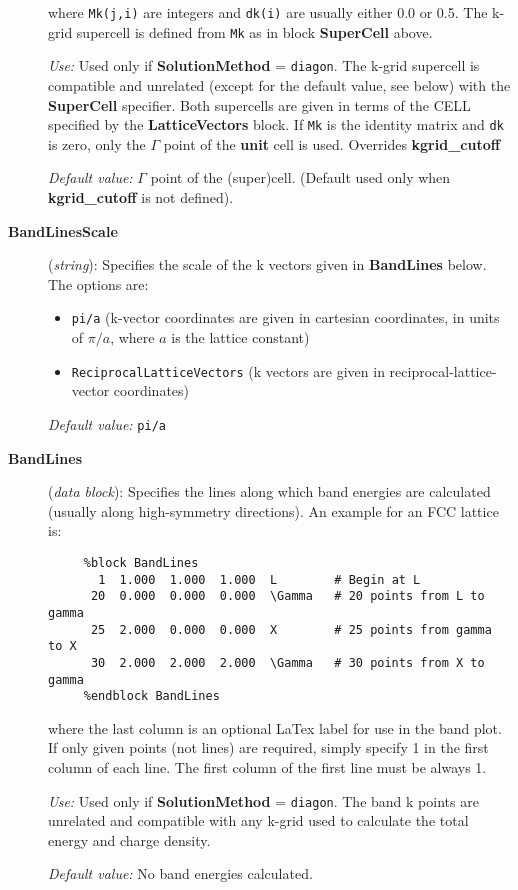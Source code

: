 \documentclass[11pt]{article}
\begin{document}
\begin{description}
where {\tt Mk(j,i)} are integers and {\tt dk(i)} are usually
either 0.0 or 0.5. The k-grid supercell is defined from {\tt Mk}
as in block {\bf SuperCell} above.

{\it Use:} Used only if {\bf SolutionMethod} = {\tt diagon}.
The k-grid supercell is compatible and unrelated 
(except for the default value, see below)
with the {\bf SuperCell} specifier. Both supercells are given in 
terms of the CELL specified by the {\bf LatticeVectors} block.
If {\tt Mk} is the identity matrix and {\tt dk} 
is zero, only the $\Gamma$ point of the {\bf unit} cell is used. 
Overrides {\bf kgrid\_cutoff}

{\it Default value:} $\Gamma$ point of the (super)cell.
(Default used only when {\bf kgrid\_cutoff} is not defined).
        


\item[{\bf BandLinesScale}] ({\it string}): 
Specifies the scale of the k vectors given in {\bf BandLines} below.
The options are:
\begin{itemize}
\item {\tt pi/a} (k-vector coordinates are given in cartesian 
coordinates, in units of $\pi/a$, where $a$ is the lattice constant)
\item {\tt ReciprocalLatticeVectors} (k vectors are given in
reciprocal-lattice-vector coordinates)
\end{itemize}

{\it Default value:} {\tt pi/a}


\item[{\bf BandLines}] ({\it data block}): 
Specifies the lines along which band energies are calculated
(usually along high-symmetry directions).
An example for an FCC lattice is:

\begin{verbatim}
     %block BandLines
       1  1.000  1.000  1.000  L        # Begin at L
      20  0.000  0.000  0.000  \Gamma   # 20 points from L to gamma
      25  2.000  0.000  0.000  X        # 25 points from gamma to X
      30  2.000  2.000  2.000  \Gamma   # 30 points from X to gamma
     %endblock BandLines
\end{verbatim}

where the last column is an optional LaTex label for use in the band plot.
If only given points (not lines) are required, simply specify 1 in the
first column of each line. The first column of the first line must be 
always 1.

{\it Use:} Used only if {\bf SolutionMethod} = {\tt diagon}.
The band k points are unrelated and compatible with any k-grid used
to calculate the total energy and charge density.

{\it Default value:} No band energies calculated.


\end{description}
\end{document}
